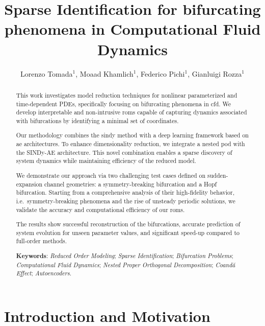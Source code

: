 \documentclass[reqno]{amsart}[standalone]
\theoremstyle{definition}
\theoremstyle{remark}
\begin{document}
\title[]{Sparse Identification for bifurcating phenomena in Computational Fluid Dynamics}
\author{Lorenzo Tomada$^{1}$, Moaad Khamlich$^{1}$, Federico Pichi$^{1}$, Gianluigi Rozza$^{1}$}
\address{$^1$ mathLab, Mathematics Area, SISSA, via Bonomea 265, I-34136 Trieste, Italy}
\maketitle

%
\begin{abstract}
%

This work investigates model reduction techniques for nonlinear parameterized and time-dependent PDEs, specifically focusing on bifurcating phenomena in \gls{cfd}.
We develop interpretable and non-intrusive \glspl{rom} capable of capturing dynamics associated with bifurcations by identifying a minimal set of coordinates.

Our methodology combines the \gls{sindy} method with a deep learning framework based on \gls{ae} architectures.
To enhance dimensionality reduction, we integrate a nested \gls{pod} with the SINDy-AE architecture.
This novel combination enables a sparse discovery of system dynamics while maintaining efficiency of the reduced model.

We demonstrate our approach via two challenging test cases defined on sudden-expansion channel geometries: a symmetry-breaking bifurcation and a Hopf bifurcation.
%
Starting from a comprehensive analysis of their high-fidelity behavior, i.e.\ symmetry-breaking phenomena and the rise of unsteady periodic solutions, we validate
%
the accuracy and computational efficiency of our \glspl{rom}.
%

The results show successful reconstruction of the bifurcations, accurate prediction of system evolution for unseen parameter values, and significant speed-up compared to full-order methods.

%

\textbf{Keywords}: \textit{Reduced Order Modeling}; \textit{Sparse Identification}; \textit{Bifurcation Problems}; \textit{Computational Fluid Dynamics}; \textit{Nested Proper Orthogonal Decomposition}; \textit{Coandă Effect}; \textit{Autoencoders}.


\end{abstract}

%
\section{Introduction and Motivation}
\label{sec:intro}
\end{document}
